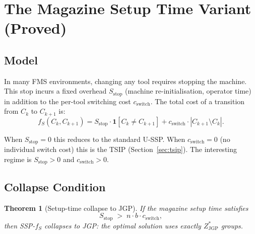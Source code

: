 \documentclass[11pt,a4paper]{article}
\theoremstyle{plain}
\newtheorem{theorem}{Theorem}[section]
\theoremstyle{definition}
\newcommand{\ZJGP}{Z_{\mathrm{JGP}}^*}
\begin{document}
\section{The Magazine Setup Time Variant (Proved)}
\label{sec:setup_time}

\subsection{Model}

In many FMS environments, changing any tool requires stopping the machine.
This stop incurs a fixed overhead $S_\mathrm{stop}$ (machine re-initialisation,
operator time) in addition to the per-tool switching cost $c_\mathrm{switch}$.
The total cost of a transition from $C_k$ to $C_{k+1}$ is:
\[
  f_{S}(C_k, C_{k+1}) = S_\mathrm{stop} \cdot \mathbf{1}[C_k \ne C_{k+1}]
  + c_\mathrm{switch} \cdot |C_{k+1} \setminus C_k|.
\]

When $S_\mathrm{stop} = 0$ this reduces to the standard U-SSP.
When $c_\mathrm{switch} = 0$ (no individual switch cost) this is the TSIP (Section~\ref{sec:tsip}).
The interesting regime is $S_\mathrm{stop} > 0$ and $c_\mathrm{switch} > 0$.

\subsection{Collapse Condition}

\begin{thmbox}
\begin{theorem}[Setup-time collapse to JGP]
\label{thm:setup_collapse}
If the magazine setup time satisfies
\[
  S_\mathrm{stop} \;>\; n \cdot b \cdot c_\mathrm{switch},
\]
then SSP-$f_S$ collapses to JGP: the optimal solution uses exactly $\ZJGP$ groups.
\end{theorem}
\end{thmbox}
\end{document}
